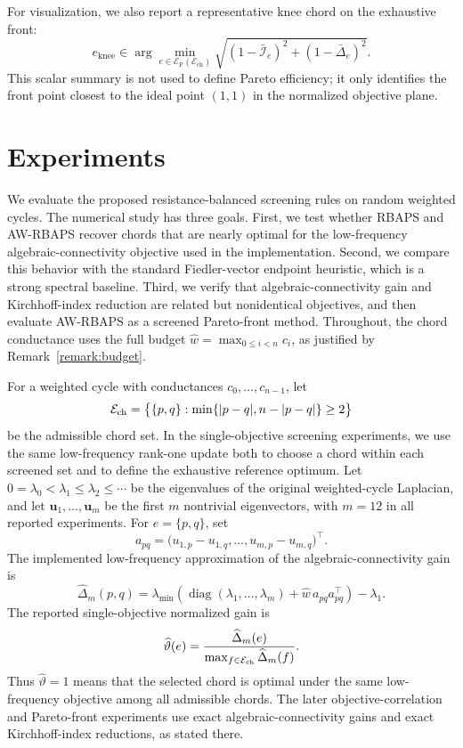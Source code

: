 \documentclass[11pt]{article}
\numberwithin{equation}{section}
\theoremstyle{definition}
\theoremstyle{remark}
\begin{document}
For visualization, we also report a representative knee chord on the
exhaustive front:
\begin{equation}\label{eq:pareto_knee_chord}
	e_{\mathrm{knee}}
	\in
	\arg\min_{e\in\mathcal E_{\mathrm P}(\mathcal E_{\mathrm{ch}})}
	\sqrt{(1-\bar{\mathcal I}_e)^2+(1-\bar\Delta_e)^2}.
\end{equation}
This scalar summary is not used to define Pareto efficiency; it only
identifies the front point closest to the ideal point $(1,1)$ in the
normalized objective plane.


\section{Experiments}\label{sec:experiments}

We evaluate the proposed resistance-balanced screening rules on random
weighted cycles. The numerical study has three goals. First, we test whether
RBAPS and AW-RBAPS recover chords that are nearly optimal for the
low-frequency algebraic-connectivity objective used in the implementation.
Second, we compare this behavior with the standard Fiedler-vector endpoint
heuristic, which is a strong spectral baseline. Third, we verify that
algebraic-connectivity gain and Kirchhoff-index reduction are related but
nonidentical objectives, and then evaluate AW-RBAPS as a screened
Pareto-front method. Throughout, the chord conductance uses the full budget
$\hat w=\max_{0\le i<n}c_i$, as justified by
Remark~\ref{remark:budget}.

For a weighted cycle with conductances $c_0,\ldots,c_{n-1}$, let
\[
\mathcal E_{\rm ch}
=
\bigl\{\{p,q\}: \min\{|p-q|,n-|p-q|\}\ge 2\bigr\}
\]
be the admissible chord set. In the single-objective screening experiments,
we use the same low-frequency rank-one update both to choose a chord within
each screened set and to define the exhaustive reference optimum. Let
$0=\lambda_0<\lambda_1\le\lambda_2\le\cdots$ be the eigenvalues of the
original weighted-cycle Laplacian, and let $\boldsymbol u_1,\ldots,
\boldsymbol u_m$ be the first $m$ nontrivial eigenvectors, with
$m=12$ in all reported experiments. For $e=\{p,q\}$, set
\[
a_{pq}
=
\bigl(u_{1,p}-u_{1,q},\ldots,u_{m,p}-u_{m,q}\bigr)^\top .
\]
The implemented low-frequency approximation of the algebraic-connectivity
gain is
\begin{equation}\label{eq:lf_delta_experiment}
	\widehat\Delta_m(p,q)
	=
	\lambda_{\min}\!\left(
	\operatorname{diag}(\lambda_1,\ldots,\lambda_m)
	+
	\hat w\,a_{pq}a_{pq}^{\top}
	\right)
	-
	\lambda_1 .
\end{equation}
The reported single-objective normalized gain is
\begin{equation}\label{eq:normalized_lf_gain_experiment}
	\widehat\vartheta(e)
	=
	\frac{\widehat\Delta_m(e)}
	{\max_{f\in\mathcal E_{\rm ch}}\widehat\Delta_m(f)}.
\end{equation}
Thus $\widehat\vartheta=1$ means that the selected chord is optimal under
the same low-frequency objective among all admissible chords. The later
objective-correlation and Pareto-front experiments use exact
algebraic-connectivity gains and exact Kirchhoff-index reductions, as stated
there.
\end{document}
